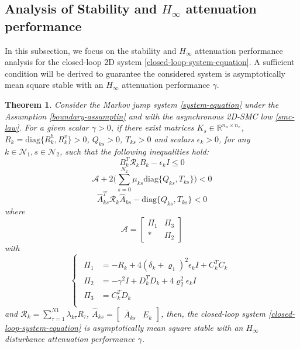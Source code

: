 \documentclass[conference]{IEEEtran}
\newtheorem{theorem}{Theorem}
\begin{document}
\subsection{Analysis of Stability and $H_{\infty}$ attenuation performance } \label{stability&H_infty}
 In this subsection, we focus on the stability and $H_{\infty}$ attenuation performance analysis for the closed-loop 2D system \eqref{closed-loop-system-equation}. A sufficient condition will be derived to guarantee the considered system is  asymptotically mean square stable with an $H_{\infty}$ attenuation performance $\gamma$.
\begin{theorem}
	Consider the  Markov jump system \eqref{system-equation} under the Assumption \eqref{boundary-assumptin} and with the asynchronous 2D-SMC low \eqref{smc-law}. For a given scalar $\gamma>0$, if there exist matrices $K_{s}\in\mathbb{R}^{n_u\times n_x}$,  $R_{k}=\mathrm{diag}\{R^{h}_{k},R^{v}_{k}\}>0$,  $Q_{ks}>0$, $T_{ks}>0$ and scalars $\epsilon_{k}>0$, for any $k\in\mathcal{N}_{1}, s\in\mathcal{N}_{2}$,  such that the following inequalities hold: 
	\begin{equation}\label{T1C1}
	B^{T}_{k}  	\mathcal{R}_{k} B_{k} -\epsilon_{k}I \leq 0
	\end{equation}
	\begin{equation}\label{T1C2}
	\mathcal{A} +2\Big(\sum_{s=0}^{N_{2}}\mu_{ks} \mathrm{diag}\{Q_{ks}, T_{ks}\}\Big) < 0
	\end{equation}
	\begin{equation}\label{T1C3}
	\hat{A}^{T}_{ks}\mathcal{R}_{k}\hat{A}_{ks} - \mathrm{diag}\{Q_{ks}, T_{ks}\} < 0
	\end{equation}
	where
	\begin{equation*}
	\mathcal{A}=\begin{bmatrix}
	\varPi_{1} & \varPi_{3}\\
	*&\varPi_{2}
	\end{bmatrix}
	\end{equation*} with
	\begin{equation*} \label{varPi}
	\left\{
	\begin{array}{lr}
	\begin{split}
	\varPi_{1}&=-R_{k}+4(\delta_{k}+\varrho_{1})^{2}\epsilon_{k}I+C^{T}_{k}C_{k}\\
	\varPi_{2}&=-\gamma^{2}I+D^{T}_{k}D_{k}+4\varrho_{2}^{2}\epsilon_{k}I\\
	\varPi_{3}&= C_{k}^{T}D_{k}\\
	\end{split}
	\end{array}
	\right.
	\end{equation*}
	and $\mathcal{R}_{k}=\sum_{\tau=1}^{N1}\lambda_{k\tau}R_{\tau}$, $\hat{A}_{ks}=\begin{bmatrix}
	\bar{A}_{ks}& E_{k}
	\end{bmatrix}$, 
	then, the closed-loop system \eqref{closed-loop-system-equation} is asymptotically mean square stable with an $H_{\infty}$ disturbance attenuation performance $\gamma$.
\end{theorem}
\end{document}
